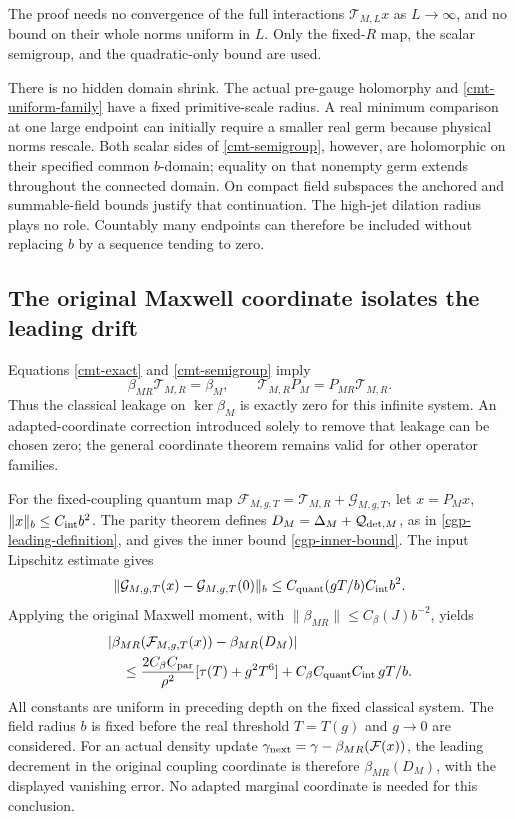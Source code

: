 The proof needs no convergence of the full interactions
\(\mathcal T_{M,L}x\) as \(L\to\infty\), and no bound on
their whole norms uniform in \(L\). Only the fixed-\(R\)
map, the scalar semigroup, and the quadratic-only bound
are used.

There is no hidden domain shrink. The actual pre-gauge
holomorphy and \eqref{cmt-uniform-family} have a fixed
primitive-scale radius. A real minimum comparison at
one large endpoint can initially require a smaller real
germ because physical norms rescale. Both scalar sides
of \eqref{cmt-semigroup}, however, are holomorphic on
their specified common \(b\)-domain; equality on that
nonempty germ extends throughout the connected domain.
On compact field subspaces the anchored and summable-field
bounds justify that continuation. The high-jet dilation
radius plays no role. Countably many endpoints can
therefore be included without replacing \(b\) by a
sequence tending to zero.

\subsection{The original Maxwell coordinate isolates the leading drift}
\label{cmt-drift-section}

Equations \eqref{cmt-exact} and \eqref{cmt-semigroup} imply
\begin{equation}
 \beta_{MR}\mathcal T_{M,R}=\beta_M,\qquad
 \mathcal T_{M,R}P_M=P_{MR}\mathcal T_{M,R}.
 \label{cmt-commutation}
\end{equation}
Thus the classical leakage on \(\ker\beta_M\) is exactly
zero for this infinite system. An adapted-coordinate
correction introduced solely to remove that leakage
can be chosen zero; the general coordinate theorem
remains valid for other operator families.

For the fixed-coupling quantum map
\(\mathcal F_{M,g,T}=\mathcal T_{M,R}+\mathcal G_{M,g,T}\),
let \(x=P_Mx\), \(\|x\|_b\le C_{\rm int}b^2\). The parity
theorem defines
\(D_M=\Delta_M+\mathcal Q_{{\rm det},M}\), as in
\eqref{cgp-leading-definition}, and gives the inner bound
\eqref{cgp-inner-bound}. The input Lipschitz estimate gives
\[
 \|\mathcal G_{M,g,T}(x)-\mathcal G_{M,g,T}(0)\|_b
      \le C_{\rm quant}(gT/b)C_{\rm int}b^2.
\]
Applying the original Maxwell moment, with
\(\|\beta_{MR}\|\le C_\beta(J)b^{-2}\), yields
\begin{align}
 &|\beta_{MR}(\mathcal F_{M,g,T}(x))
                         -\beta_{MR}(D_M)|\notag\\
 &\quad\le
   \frac{2C_\beta C_{\rm par}}{\rho^2}
                         [\tau(T)+g^2T^6]
       +C_\beta C_{\rm quant}C_{\rm int}\,gT/b.
 \label{cmt-drift-bound}
\end{align}
All constants are uniform in preceding depth on the fixed
classical system. The field radius \(b\) is fixed before
the real threshold \(T=T(g)\) and \(g\to0\) are considered.
For an actual density update
\(\gamma_{\rm next}=\gamma-\beta_{MR}(\mathcal F(x))\),
the leading decrement in the original coupling coordinate
is therefore \(\beta_{MR}(D_M)\), with the displayed
vanishing error. No adapted marginal coordinate is needed
for this conclusion.

